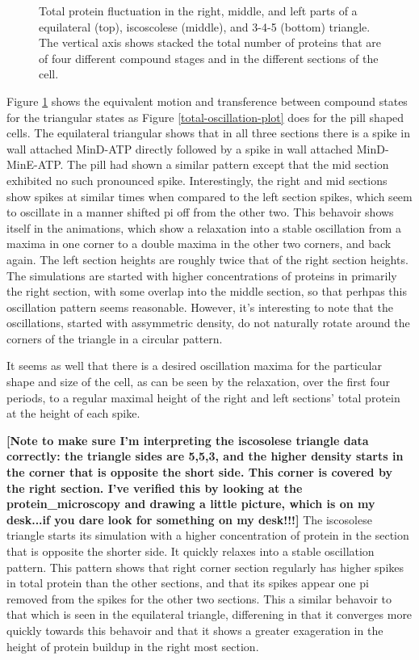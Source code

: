 \documentclass[letterpaper,twocolumn,amsmath,amssymb,pre]{revtex4-1}
\newcommand{\red}[1]{{\bf \color{red} #1}}
\newcommand{\fixme}[1]{\red{[#1]}}
\begin{document}
\begin{figure}
  \caption{Total protein fluctuation in the right, middle, and left
    parts of a equilateral (top), iscoscolese (middle), and 3-4-5
    (bottom) triangle.  The vertical axis shows stacked the total
    number of proteins that are of four different compound stages and
    in the different sections of the cell.}
  \label{total-oscillation-triangle-plot}
\end{figure}

Figure \ref{total-oscillation-triangle-plot} shows the equivalent
motion and transference between compound states for the triangular
states as Figure \ref{total-oscillation-plot} does for the pill shaped
cells.  The equilateral triangular shows that in all three sections
there is a spike in wall attached MinD-ATP directly followed by a
spike in wall attached MinD-MinE-ATP.  The pill had shown a similar
pattern except that the mid section exhibited no such pronounced
spike.  Interestingly, the right and mid sections show spikes at
similar times when compared to the left section spikes, which seem to
oscillate in a manner shifted pi off from the other two.  This
behavoir shows itself in the animations, which show a relaxation into
a stable oscillation from a maxima in one corner to a double maxima in
the other two corners, and back again.  The left section heights are
roughly twice that of the right section heights.  The simulations are
started with higher concentrations of proteins in primarily the right
section, with some overlap into the middle section, so that perhpas
this oscillation pattern seems reasonable.  However, it's interesting
to note that the oscillations, started with assymmetric density, do
not naturally rotate around the corners of the triangle in a circular
pattern.

It seems as well that there is a desired oscillation maxima for the
particular shape and size of the cell, as can be seen by the
relaxation, over the first four periods, to a regular maximal height
of the right and left sections' total protein at the height of each spike.

\fixme{Note to make sure I'm interpreting the iscosolese triangle data
  correctly: the triangle sides are 5,5,3, and the higher density
  starts in the corner that is opposite the short side.  This corner
  is covered by the right section.  I've verified this by looking at
  the protein_microscopy and drawing a little picture, which is on my
  desk...if you dare look for something on my desk!!!}  The iscosolese
triangle starts its simulation with a higher concentration of protein
in the section that is opposite the shorter side.  It quickly relaxes
into a stable oscillation pattern.  This pattern shows that right
corner section regularly has higher spikes in total protein than the
other sections, and that its spikes appear one pi removed from the
spikes for the other two sections.  This a similar behavoir to that
which is seen in the equilateral triangle, differening in that it
converges more quickly towards this behavoir and that it shows a
greater exageration in the height of protein buildup in the right most
section.
\end{document}

